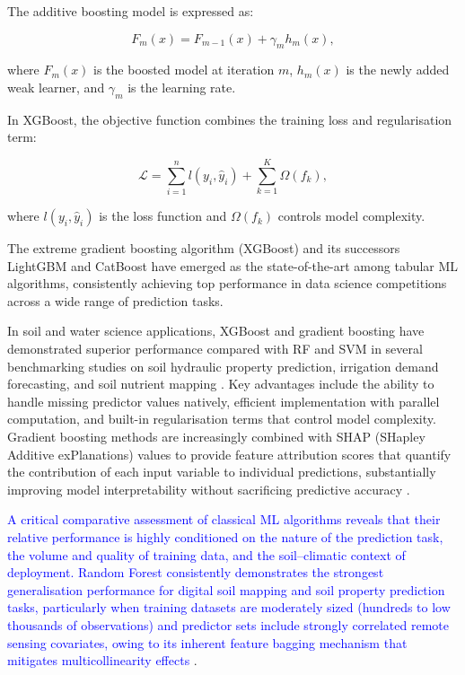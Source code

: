 \documentclass[land,article,submit,pdftex,moreauthors]{Definitions/mdpi}
\numberwithin{equation}{section}
\begin{document}
The additive boosting model is expressed as:

\begin{equation}
F_m(x)=F_{m-1}(x)+\gamma_m h_m(x),
\end{equation}

where $F_m(x)$ is the boosted model at iteration $m$, $h_m(x)$ is the newly added weak learner, and $\gamma_m$ is the learning rate.

In XGBoost, the objective function combines the training loss and regularisation term:

\begin{equation}
\mathcal{L}=
\sum_{i=1}^{n}
l(y_i,\hat{y}_i)
+
\sum_{k=1}^{K}\Omega(f_k),
\end{equation}

where $l(y_i,\hat{y}_i)$ is the loss function and $\Omega(f_k)$ controls model complexity.

The extreme gradient boosting algorithm (XGBoost) \citep{chen2016xgboost} and its successors LightGBM and CatBoost have emerged as the state-of-the-art among tabular ML algorithms, consistently achieving top performance in data science competitions across a wide range of prediction tasks.

In soil and water science applications, XGBoost and gradient boosting have demonstrated superior performance compared with RF and SVM in several benchmarking studies on soil hydraulic property prediction, irrigation demand forecasting, and soil nutrient mapping \textcolor{blue}{\citep{hengl2017soilgrids250m, zhang2018deep, Lemenkova202518}}. Key advantages include the ability to handle missing predictor values natively, efficient implementation with parallel computation, and built-in regularisation terms that control model complexity. Gradient boosting methods are increasingly combined with SHAP (SHapley Additive exPlanations) values \citep{lundberg2017unified} to provide feature attribution scores that quantify the contribution of each input variable to individual predictions, substantially improving model interpretability without sacrificing predictive accuracy \citep{Lemenkova202518, Lemenkova202505}.

\textcolor{blue}{A critical comparative assessment of classical ML algorithms reveals that their relative performance is highly conditioned on the nature of the prediction task, the volume and quality of training data, and the soil--climatic context of deployment. Random Forest consistently demonstrates the strongest generalisation performance for digital soil mapping and soil property prediction tasks, particularly when training datasets are moderately sized (hundreds to low thousands of observations) and predictor sets include strongly correlated remote sensing covariates, owing to its inherent feature bagging mechanism that mitigates multicollinearity effects} \citep{hengl2017soilgrids250m}. 
\end{document}
